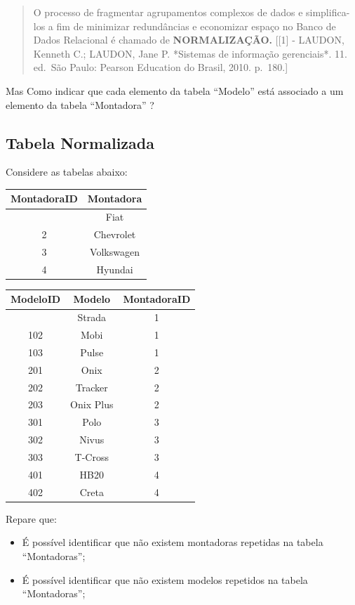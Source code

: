 \documentclass[
]{book}
\begin{document}
\begin{quote}
O processo de fragmentar agrupamentos complexos de dados e simplifica-los a fim de minimizar redundâncias e economizar espaço no Banco de Dados Relacional é chamado de \textbf{NORMALIZAÇÃO.} {[}{[}1{]} - LAUDON, Kenneth C.; LAUDON, Jane P. *Sistemas de informação gerenciais*. 11. ed.~São Paulo: Pearson Education do Brasil, 2010. p.~180.{]}
\end{quote}

Mas Como indicar que cada elemento da tabela ``Modelo'' está associado a um elemento da tabela ``Montadora'' ?

\subsection{Tabela Normalizada}\label{tabela-normalizada}

Considere as tabelas abaixo:

\begin{longtable}[]{@{}cc@{}}
\toprule\noalign{}
MontadoraID & Montadora \\
\midrule\noalign{}
\endhead
\bottomrule\noalign{}
\endlastfoot
1 & Fiat \\
2 & Chevrolet \\
3 & Volkswagen \\
4 & Hyundai \\
\end{longtable}

\begin{longtable}[]{@{}ccc@{}}
\toprule\noalign{}
ModeloID & Modelo & MontadoraID \\
\midrule\noalign{}
\endhead
\bottomrule\noalign{}
\endlastfoot
101 & Strada & 1 \\
102 & Mobi & 1 \\
103 & Pulse & 1 \\
201 & Onix & 2 \\
202 & Tracker & 2 \\
203 & Onix Plus & 2 \\
301 & Polo & 3 \\
302 & Nivus & 3 \\
303 & T-Cross & 3 \\
401 & HB20 & 4 \\
402 & Creta & 4 \\
\end{longtable}

Repare que:

\begin{itemize}
\item
  É possível identificar que não existem montadoras repetidas na tabela ``Montadoras'';
\item
  É possível identificar que não existem modelos repetidos na tabela ``Montadoras'';
\end{itemize}
\end{document}
